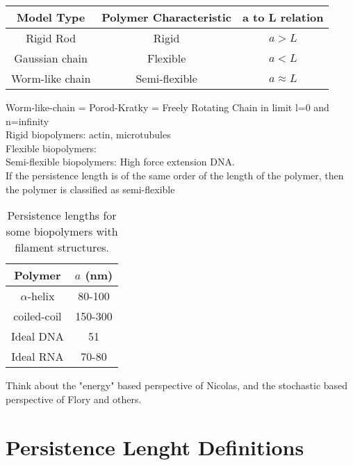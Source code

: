 \begin{table}[htbp]
\begin{center}  
\begin{tabular}{c|c|c}
\hline
Model Type      & Polymer Characteristic & a to L relation\\ \hline
Rigid Rod       & Rigid          &        $a > L$   \\
Gaussian chain  & Flexible       &        $a < L$   \\
Worm-like chain & Semi-flexible  &    $a \approx L$ \\
\hline
\end{tabular}
\end{center}
\end{table}

Worm-like-chain = Porod-Kratky = Freely Rotating Chain in limit l=0
and n=infinity
\\

Rigid biopolymers:
actin, microtubules
\\

Flexible biopolymers:
\\

Semi-flexible biopolymers:
High force extension DNA.
\\

If the persistence length is of the same order of the length of the
polymer, then the polymer is classified as  semi-flexible


\begin{table}[htbp]
\begin{center}  
\begin{tabular}{c|c}
\hline
Polymer       & $a$ (nm)   \\ \hline
$\alpha$-helix & 80-100\\
coiled-coil & 150-300\\
Ideal DNA  &  51  \\
Ideal RNA & 70-80 \\
\hline
\end{tabular}
\caption{Persistence lengths for some biopolymers with filament structures.}
\end{center}
\end{table}

Think about the "energy" based perspective of Nicolas, and the
stochastic based perspective of Flory and others.




\section{Persistence Lenght Definitions}

